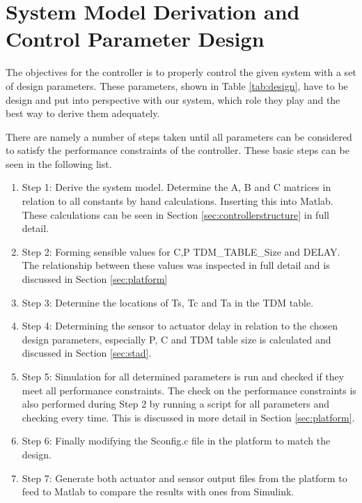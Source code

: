 \section{System Model Derivation and Control Parameter Design}
The objectives for the controller is to properly control the given system with a set of design parameters. These parameters, shown in Table \ref{tab:design}, have to be design and put into perspective with our system, which role they play and the best way to derive them adequately.

There are namely a number of steps taken until all parameters can be considered to satisfy the performance constraints of the controller. These basic steps can be seen in the following list.

\begin{enumerate}
	\item Step 1: Derive the system model. Determine the A, B and C matrices in relation to all constants by hand calculations. Inserting this into Matlab. These calculations can be seen in Section \ref{sec:controllerstructure} in full detail.
	\item Step 2: Forming sensible values for C,P TDM\_TABLE\_Size and DELAY. The relationship between these values was inspected in full detail and is discussed in Section \ref{sec:platform}
	\item Step 3: Determine the locations of Ts, Tc and Ta in the TDM table.
	\item Step 4: Determining the sensor to actuator delay in relation to the chosen design parameters, especially P, C and TDM table size is calculated and discussed in Section \ref{sec:stad}. 
	\item Step 5: Simulation for all determined parameters is run and checked if they meet all performance constraints. The check on the performance constraints is also performed during Step 2 by running a script for all parameters and checking every time. This is discussed in more detail in Section \ref{sec:platform}.
	\item Step 6: Finally modifying the Sconfig.c file in the platform to match the design.
	\item Step 7: Generate both actuator and sensor output files from the platform to feed to Matlab to compare the results with ones from Simulink.
\end{enumerate}


